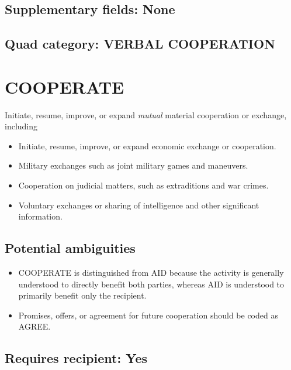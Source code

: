 \documentclass[11pt]{report}
\newcommand{\plcat}[1]{\textsf{#1}}
\newcommand{\ti}[1]{\textit{#1}}
\begin{document}
\subsection{Supplementary fields: None}

\subsection{Quad category: VERBAL COOPERATION}


\newpage

\section{COOPERATE}

Initiate, resume, improve, or expand \ti{mutual} material cooperation or exchange, including

\begin{itemize}
\item Initiate, resume, improve, or expand economic exchange or cooperation.

\item Military exchanges such as joint military games and maneuvers.

\item Cooperation on judicial matters, such as extraditions and war crimes.

\item Voluntary exchanges or sharing of intelligence and other significant information.

\end{itemize}

\subsection{Potential ambiguities}

\begin{itemize}
\item \plcat{COOPERATE} is distinguished from \plcat{AID} because the activity is generally understood to directly benefit both parties, whereas  \plcat{AID} is understood to primarily benefit only the recipient.
\item Promises, offers, or agreement for future cooperation should be coded as \plcat{AGREE}.
\end{itemize}

\subsection{Requires recipient: Yes}
\end{document}
